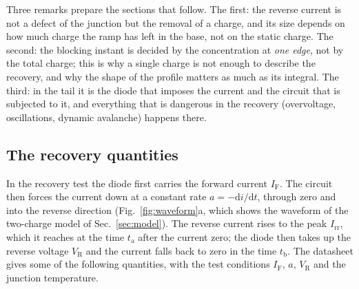 \documentclass[10pt,a4paper]{scrartcl}
\newcommand{\IF}{I_\mathrm{F}}
\newcommand{\VR}{V_\mathrm{R}}
\newcommand{\Irr}{I_\mathrm{rr}}
\newcommand{\ta}{t_\mathrm{a}}
\newcommand{\tb}{t_\mathrm{b}}
\newcommand{\diff}{\mathrm{d}}
\begin{document}
Three remarks prepare the sections that follow. The first: the reverse current is not a defect of the junction but the removal of a charge, and its size depends on how much charge the ramp has left in the base, not on the static charge. The second: the blocking instant is decided by the concentration at \emph{one edge}, not by the total charge; this is why a single charge is not enough to describe the recovery, and why the shape of the profile matters as much as its integral. The third: in the tail it is the diode that imposes the current and the circuit that is subjected to it, and everything that is dangerous in the recovery (overvoltage, oscillations, dynamic avalanche) happens there.
\subsection{The recovery quantities}
\label{sec:rrdata}
In the recovery test the diode first carries the forward current $\IF$. The circuit then forces the current down at a constant rate $a = -\diff i/\diff t$, through zero and into the reverse direction (Fig.~\ref{fig:waveform}a, which shows the waveform of the two-charge model of Sec.~\ref{sec:model}). The reverse current rises to the peak $\Irr$, which it reaches at the time $\ta$ after the current zero; the diode then takes up the reverse voltage $\VR$ and the current falls back to zero in the time $\tb$. The datasheet gives some of the following quantities, with the test conditions $\IF$, $a$, $\VR$ and the junction temperature.
\end{document}
